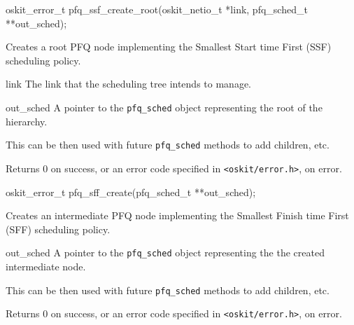 \begin{apisyn}

	\funcproto oskit_error_t pfq_ssf_create_root(oskit_netio_t *link,
				pfq_sched_t **out_sched);
\end{apisyn}
\begin{apidesc}
	Creates a root PFQ node implementing the Smallest Start time
	First (SSF) scheduling policy.
\end{apidesc}
\begin{apiparm}
	\item[link]
		The link that the scheduling tree intends to manage.
	\item[out_sched]
		A pointer to the \texttt{pfq_sched} object representing
		the root of the hierarchy.

		This can be then used with future \texttt{pfq_sched}
		methods to add children, etc.
\end{apiparm}
\begin{apiret}
	Returns 0 on success, or an error code specified in
	\texttt{<oskit/error.h>}, on error.
\end{apiret}

\begin{apisyn}

	\funcproto oskit_error_t pfq_sff_create(pfq_sched_t **out_sched);
\end{apisyn}
\begin{apidesc}
	Creates an intermediate PFQ node implementing the Smallest Finish
	time First (SFF) scheduling policy.
\end{apidesc}
\begin{apiparm}
	\item[out_sched]
		A pointer to the \texttt{pfq_sched} object representing
		the the created intermediate node.

		This can be then used with future \texttt{pfq_sched}
		methods to add children, etc.
\end{apiparm}
\begin{apiret}
	Returns 0 on success, or an error code specified in
	\texttt{<oskit/error.h>}, on error.
\end{apiret}

